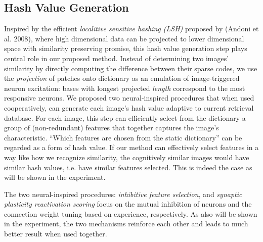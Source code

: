 \documentclass[letterpaper]{article}
\begin{document}
\subsection{Hash Value Generation}
Inspired by the efficient \emph{localitive sensitive hashing (LSH)} proposed by (Andoni et al. 2008), where high dimensional data can be projected to lower dimensional space with similarity preserving promise, this hash value generation step plays central role in our proposed method.
Instead of determining two images' similarity by directly computing the difference between their sparse codes, we use the \emph{projection} of patches onto dictionary as an emulation of image-triggered neuron excitation: bases with longest projected \emph{length} correspond to the most responsive neurons. We proposed two neural-inspired procedures that when used cooperatively, can generate each image's hash value adaptive to current retrieval database. For each image, this step can efficiently select from the dictionary a group of (non-redundant) features that together captures the image's characteristic. ``Which features are chosen from the static dictionary'' can be regarded as a form of hash value. If our method can effectively select features in a way like how we recognize similarity, the cognitively similar images would have similar hash values, i.e. have similar features selected. This is indeed the case as will be shown in the experiment.

The two neural-inspired procedures: \emph{inhibitive feature selection}, and \emph{synaptic plasticity reactivation scoring} focus on the mutual inhibition of neurons and the connection weight tuning based on experience, respectively. As also will be shown in the experiment, the two mechanisms reinforce each other and leads to much better result when used together.
\end{document}
